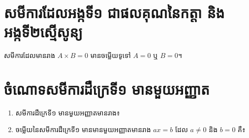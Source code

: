\section{សមីការដែលអង្កទី១ ជាផលគុណនៃកត្តា និងអង្កទី២ស្មើសូន្យ}
\begin{general}
សមីការដែលមានរាង $A\times B=0$ មានចម្លើយទូទៅ $A=0$ ឬ $B=0$។
\end{general}
\section{ចំណោទសមីការដឺក្រេទី១ មានមួយអញ្ញាត}

\newpage
\pros
\begin{enumerate}
\item សមីការដឺក្រេទី១ មានមួយអញ្ញាតមានរាង៖
\begin{enumerate}[label=\alph*.]
\end{enumerate}

\item  ចម្លើយនៃសមីការដឺក្រេទី១ មានមានមួយអញ្ញាតមានរាង $ax=b$ ដែល $a\ne 0$ និង $b=0$ គឺ៖
\begin{enumerate}[label=\alph*.]
\end{enumerate}


\end{enumerate}
